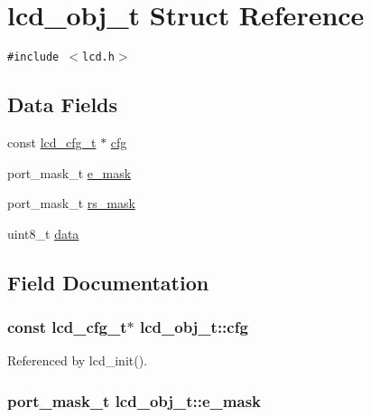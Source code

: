 \hypertarget{structlcd__obj__t}{
\section{lcd\_\-obj\_\-t Struct Reference}
\label{structlcd__obj__t}
}
{\tt \#include $<$lcd.h$>$}

\subsection*{Data Fields}
\begin{CompactItemize}
\item 
const \hyperlink{structlcd__cfg__t}{lcd\_\-cfg\_\-t} $\ast$ \hyperlink{structlcd__obj__t_ed7f957f2e9f5d8346db7861eec007bf}{cfg}
\item 
port\_\-mask\_\-t \hyperlink{structlcd__obj__t_9eb7c1bfd7a2071b89d33b9523db22d3}{e\_\-mask}
\item 
port\_\-mask\_\-t \hyperlink{structlcd__obj__t_458e3fe9bac9f6bc0f3fa835c535e3c5}{rs\_\-mask}
\item 
uint8\_\-t \hyperlink{structlcd__obj__t_b7c60cc77dfe924656e0ea6e36fec0d8}{data}
\end{CompactItemize}


\subsection{Field Documentation}
\hypertarget{structlcd__obj__t_ed7f957f2e9f5d8346db7861eec007bf}{
\subsubsection{\setlength{\rightskip}{0pt plus 5cm}const {\bf lcd\_\-cfg\_\-t}$\ast$ {\bf lcd\_\-obj\_\-t::cfg}}}
\label{structlcd__obj__t_ed7f957f2e9f5d8346db7861eec007bf}




Referenced by lcd\_\-init().\hypertarget{structlcd__obj__t_9eb7c1bfd7a2071b89d33b9523db22d3}{
\subsubsection{\setlength{\rightskip}{0pt plus 5cm}port\_\-mask\_\-t {\bf lcd\_\-obj\_\-t::e\_\-mask}}}
\label{structlcd__obj__t_9eb7c1bfd7a2071b89d33b9523db22d3}




